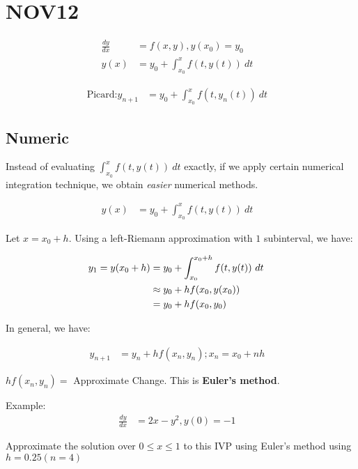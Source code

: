 \section{NOV12}

	\begin{align}
		\frac{dy}{dx} &= f(x,y), y(x_{0}) = y_{0}& \\
		y(x) &= y_{0} + \int_{x_{0}}^{x} f(t,y(t)) \ dt&
	\end{align}

	\begin{align}
		\text{Picard:} y_{n+1} &= y_{0} + \int_{x_{0}}^{x} f(t,y_{n}(t)) \ dt&
	\end{align}

	\subsection{Numeric}

		Instead of evaluating $\int_{x_{0}}^{x} f(t,y(t)) \ dt$ exactly, if we apply certain numerical integration technique, we obtain \textit{easier} numerical methods.

		\begin{align}
			y(x) &= y_{0} + \int_{x_{0}}^{x} f(t,y(t)) \ dt&
		\end{align}

		Let $x = x_{0} + h$. Using a left-Riemann approximation with $1$ subinterval, we have:

		\begin{align}
			y_{1} = y(x_{0} + h) &= y_{0} + \int_{x_{0}}^{x_{0}+h} f(t,y(t)) \ dt& \\
			&\approx y_{0}+hf(x_{0},y(x_{0})) \notag \\
			&= y_{0} + hf(x_{0}, y_{0})&
		\end{align}

		In general, we have:

		\begin{align}
			y_{n+1} &= y_{n} + hf(x_{n}, y_{n}); x_{n} = x_{0} + nh&
		\end{align}

		$hf(x_{n}, y_{n}) =$ Approximate Change.
		This is \textbf{Euler's method}.

		Example:
		\begin{align}
			\frac{dy}{dx} &= 2x - y^{2}, y(0) = -1&
		\end{align}

		Approximate the solution over $0 \leq x \leq 1$ to this IVP using Euler's method using $h = 0.25 (n = 4)$

